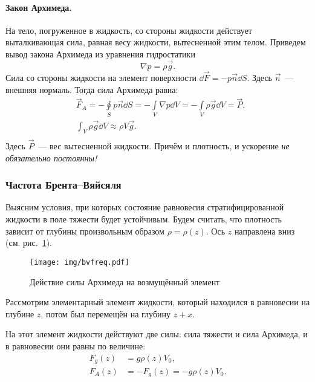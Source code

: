 \paragraph{Закон Архимеда.} На тело, погруженное в жидкость,  со стороны жидкости действует выталкивающая сила, равная весу жидкости, вытесненной этим телом. Приведем вывод закона Архимеда из уравнения гидростатики
\begin{equation}
\nabla p = \rho \vec { g }.
\end{equation}
Сила со стороны жидкости на элемент поверхности $ \dd \vec { F } = - p \vec { n }\dd{S} $. Здесь $\vec{n}$~--- внешняя нормаль. Тогда сила Архимеда равна:
\begin{equation}\begin{aligned}
& \vec { F }_ { A }  = - \oint \limits_ { S } p \vec{n}\dd{S} = - \int \limits_ { V } \nabla p\dd{V} = - \int \limits_ { V } \rho \vec { g }\dd{V}=\vec{P},\\
& \int _ { V } \rho \vec { g }\dd{V}  \approx \rho V \vec { g }. \\
\end{aligned}\end{equation}
Здесь $\vec{P}$~--- вес вытесненной жидкости. Причём и плотность, и ускорение \textit{не обязательно постоянны!}


\subsubsection{Частота Брента--Вяйсяля}
Выясним условия, при  которых состояние равновесия стратифицированной жидкости в поле тяжести будет устойчивым. Будем считать, что плотность зависит от глубины произвольным образом $\rho=\rho(z)$. Ось $z$ направлена вниз (см. рис.~\ref{fig:arch}).

\begin{figure}[H]
	\centering
	\texttt{[image: img/bvfreq.pdf]}
	\caption{Действие силы Архимеда на возмущённый элемент}
	\label{fig:arch}
\end{figure}

Рассмотрим элементарный элемент жидкости, который находился в равновесии на глубине $z$, потом был перемещён на глубину $z+x$.

На этот элемент жидкости действуют две силы: сила тяжести и сила Архимеда, и в равновесии они равны  по величине:
\begin{equation}\begin{aligned}
F _ { g } ( z ) &= g \rho ( z ) V_0,\\
F _ { A } ( z ) &= - F _ { g } ( z ) = - g \rho ( z ) V_0.
\end{aligned}\end{equation}

